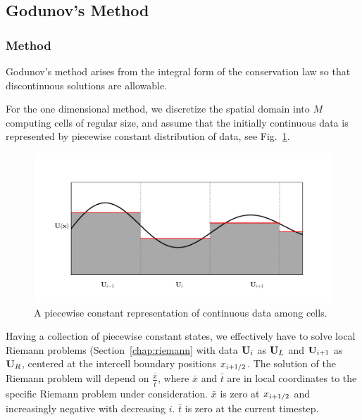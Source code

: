 \subsection{Godunov's Method}\label{chap:godunov}


\subsubsection{Method}

Godunov's method arises from the integral form of the conservation law so that
discontinuous solutions are allowable.

For the one dimensional method, we discretize the spatial domain into $M$
computing cells of regular size, and assume that the initially continuous data
is represented by piecewise constant distribution of data, see
Fig.~\ref{fig:piecewise-constant}.



\begin{figure}[H]
\includegraphics[width=\textwidth]{./figures/piecewise_const.pdf}%
\caption{
A piecewise constant representation of continuous data among cells.
\label{fig:piecewise-constant}
}
\end{figure}

Having a collection of piecewise constant states, we effectively have to solve
local Riemann problems (Section~\ref{chap:riemann} with data $\mathbf{U}_i$ as $\mathbf{U}_L$
and $\mathbf{U}_{i+1}$ as $\mathbf{U}_R$, centered at the intercell boundary positions
$x_{i+1/2}$. The solution of the Riemann problem will depend on
$\frac{\bar{x}}{\bar{t}}$, where $\bar{x}$ and $\bar{t}$ are in local
coordinates to the specific Riemann problem under consideration. $\bar{x}$ is
zero at $x_{i+1/2}$ and increasingly negative with decreasing $i$. $\bar{t}$
is zero at the current timestep.



